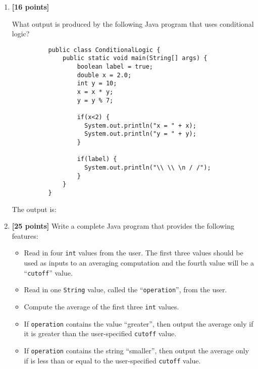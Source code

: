 \begin{enumerate}
\begin{verbatim}
(done || !done)
\end{verbatim}	

\vspace*{-.175in}
The value is: \mbox{\underline{\hspace{3in}}}

\item {\bf [16 points]}

What output is produced by the following Java program that uses conditional logic? 
\begin{verbatim}
          public class ConditionalLogic {
              public static void main(String[] args) {
                  boolean label = true;
                  double x = 2.0;
                  int y = 10;
                  x = x * y;
                  y = y % 7;

                  if(x<2) {
                    System.out.println("x = " + x);
                    System.out.println("y = " + y);
                  }

                  if(label) {
                    System.out.println("\\ \\ \n / /");
                  }
              }
          }
\end{verbatim}
\vspace*{-.05in}
The output is:
\vspace{1in}

\item {\bf [25 points]}
Write a complete Java program that provides the following features:
\begin{itemize}

  \item Read in four {\tt int} values from the user.  The first three values should be used as inputs to an averaging
    computation and the fourth value will be a ``{\tt cutoff}'' value.

  \item Read in one {\tt String} value, called the ``{\tt operation}'', from the user.

  \item Compute the average of the first three {\tt int} values.

  \item If {\tt operation} contains the value ``greater'', then output the average only if it is greater than the
    user-specified {\tt cutoff} value.

  \item If {\tt operation} contains the string ``smaller'', then output the average only if is less than or equal to the
    user-specified {\tt cutoff} value.


\end{itemize}
\end{enumerate}
